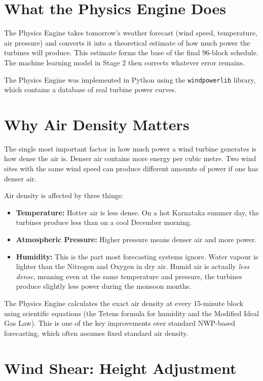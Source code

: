 \documentclass[12pt,a4paper]{report}
\begin{document}
\section{What the Physics Engine Does}

The Physics Engine takes tomorrow's weather forecast (wind speed, temperature, air pressure) and converts it into a theoretical estimate of how much power the turbines will produce. This estimate forms the base of the final 96-block schedule. The machine learning model in Stage 2 then corrects whatever error remains.

The Physics Engine was implemented in Python using the \texttt{windpowerlib} library, which contains a database of real turbine power curves.

\section{Why Air Density Matters}

The single most important factor in how much power a wind turbine generates is how dense the air is. Denser air contains more energy per cubic metre. Two wind sites with the same wind speed can produce different amounts of power if one has denser air.

Air density is affected by three things:
\begin{itemize}
    \item \textbf{Temperature:} Hotter air is less dense. On a hot Karnataka summer day, the turbines produce less than on a cool December morning.
    \item \textbf{Atmospheric Pressure:} Higher pressure means denser air and more power.
    \item \textbf{Humidity:} This is the part most forecasting systems ignore. Water vapour is lighter than the Nitrogen and Oxygen in dry air. Humid air is actually \textit{less dense}, meaning even at the same temperature and pressure, the turbines produce slightly less power during the monsoon months.
\end{itemize}

The Physics Engine calculates the exact air density at every 15-minute block using scientific equations (the Tetens formula for humidity and the Modified Ideal Gas Law). This is one of the key improvements over standard NWP-based forecasting, which often assumes fixed standard air density.

\section{Wind Shear: Height Adjustment}
\end{document}
